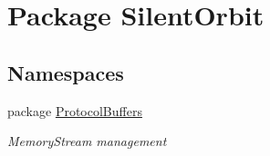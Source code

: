 \hypertarget{namespace_silent_orbit}{}\section{Package Silent\+Orbit}
\label{namespace_silent_orbit}
\subsection*{Namespaces}
\begin{DoxyCompactItemize}
\item 
package \hyperlink{namespace_silent_orbit_1_1_protocol_buffers}{Protocol\+Buffers}
\begin{DoxyCompactList}\small\item\em Memory\+Stream management \end{DoxyCompactList}\end{DoxyCompactItemize}
